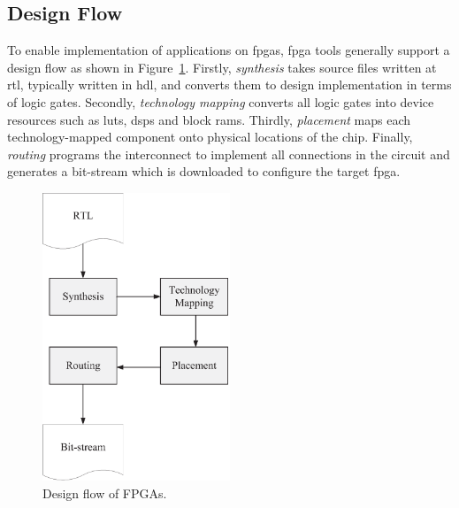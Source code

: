 \subsection{Design Flow}

To enable implementation of applications on \glspl{fpga}, \gls{fpga} tools generally support a design flow as shown in Figure~\ref{fig:bg_flow}.
Firstly, \textit{synthesis} takes source files written at \gls{rtl}, typically written in \gls{hdl}, and converts them to design implementation in terms of logic gates.
Secondly, \textit{technology mapping} converts all logic gates into device resources such as \glspl{lut}, \glspl{dsp} and block \glspl{ram}.
Thirdly, \textit{placement} maps each technology-mapped component onto physical locations of the chip.
Finally, \textit{routing} programs the interconnect to implement all connections in the circuit and generates a bit-stream which is downloaded to configure the target \gls{fpga}.

\begin{figure}[ht]
\begin{center}
\includegraphics[width=0.5\textwidth]{2_background/figures/flow}
\end{center}
\caption{Design flow of FPGAs.}
\label{fig:bg_flow}
\end{figure}

